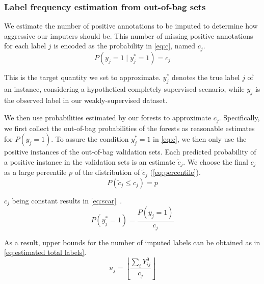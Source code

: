 \documentclass[conference,compsoc]{IEEEtran}
\newcommand{\el}[1]{_{#1}}
\begin{document}
\subsubsection{Label frequency estimation from out-of-bag sets}
\label{sec:oob c estimation}

We estimate the number of positive annotations to be imputed to determine how aggressive our imputers should be.
%
This number of missing positive annotations for each label $j$ is encoded as the probability in \autoref{eq:c}, named $c_j$.
%
\begin{equation}
    P(y_j=1 \mid y_j^\ast=1) = c_j
    \label{eq:c}
\end{equation}
%

This is the target quantity we set to approximate.
%
$y^\ast\el{j}$ denotes the true label $j$ of an instance, considering a hypothetical completely-supervised scenario, while $y\el{j}$ is the observed label in our weakly-supervised dataset.

%
%
We then use probabilities estimated by our forests to approximate $c_j$. Specifically, we first collect the out-of-bag probabilities of the forests as reasonable estimates for $P(y_j=1)$. To assure the condition $y^\ast_j=1$ in \autoref{eq:c}, we then only use the positive instances of the out-of-bag validation sets. Each predicted probability of a positive instance in the validation sets is an estimate $\tilde c_j$. We choose the final $c_j$ as a large percentile $p$ of the distribution of $\tilde c_j$ (\autoref{eq:percentile}).
%
\begin{equation}
    P(\tilde c_j \le c_j) = p
    \label{eq:percentile}
\end{equation}
%

$c_j$ being constant results in \autoref{eq:scar}~\cite{elkan2008learning,bekker2020learning}.
%
\begin{equation}
    P(y^\ast\el{j}=1) = \frac{P(y\el{j}=1)}{c\el{j}}
    \label{eq:scar}
\end{equation}
%

As a result, upper bounds for the number of imputed labels can be obtained as in \autoref{eq:estimated total labels}.
%
%
\begin{equation}
    u\el{j} = \left\lfloor \frac{\sum_i Y^0\el{ij}}{c\el{j}} \right\rfloor
    \label{eq:estimated total labels}
\end{equation}
\end{document}

